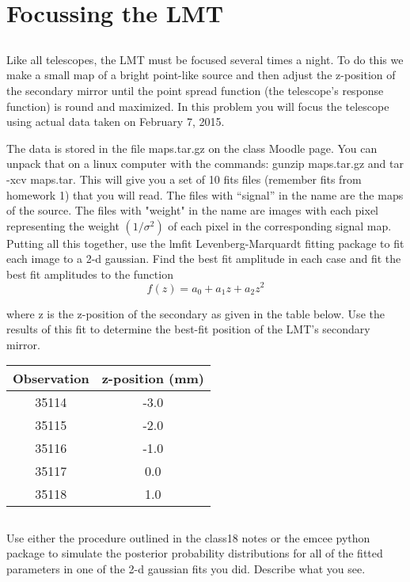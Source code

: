 \section{Focussing the LMT}

\subsection{}
Like all telescopes, the LMT must be focused
several times a night. To do this we make a small map of a bright point-like source and then
adjust the z-position of the secondary mirror until the point spread function (the telescope’s
response function) is round and maximized. In this problem you will focus the telescope using
actual data taken on February 7, 2015.

The data is stored in the file maps.tar.gz on the class Moodle page. You can unpack that on
a linux computer with the commands: gunzip maps.tar.gz and tar -xcv maps.tar. This will
give you a set of 10 fits files (remember fits from homework 1) that you will read. The files
with “signal” in the name are the maps of the source. The files with "weight" in the name are
images with each pixel representing the weight $(1/\sigma^2)$ of each pixel in the corresponding signal
map.
Putting all this together, use the lmfit Levenberg-Marquardt fitting package to fit each image
to a 2-d gaussian. Find the best fit amplitude in each case and fit the best fit amplitudes to
the function
\begin{equation}
    f(z)=a_0+a_1z+a_2z^2
\end{equation}

where z is the z-position of the secondary as given in the table below. 
Use the results of this
fit to determine the best-fit position of the LMT's secondary mirror.

\begin{table}[h]
    \centering
    \begin{tabular}{|c|c|}
        \toprule
         Observation  & z-position (mm)  \\
         \midrule
         35114 & -3.0\\
         35115 & -2.0 \\
         35116 & -1.0 \\
         35117 & 0.0 \\
         35118 & 1.0\\
         \bottomrule
    \end{tabular}
\end{table}




\subsection{}

Use either the procedure outlined in the class18 notes or the emcee
python package to simulate the posterior probability distributions for all of the fitted parameters
in one of the 2-d gaussian fits you did. Describe what you see.